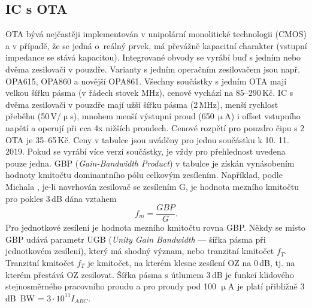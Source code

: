 \subsection{IC s OTA}
OTA bývá nejčastěji implementován v unipolární monolitické technologii (CMOS) a v případě, že se jedná o~reálný prvek, má převážně kapacitní charakter (vstupní impedance se stává kapacitou). Integrované obvody se vyrábí buď s jedním nebo dvěma zesilovači v pouzdře. Varianty s jedním operačním zesilovačem jsou např. OPA615, OPA860 a novější OPA861. Všechny součástky s jedním OTA mají velkou šířku pásma (v řádech stovek MHz), cenově vychází na 85--290\,Kč. IC s dvěma zesilovači v pouzdře mají užší šířku pásma (2\,MHz), menší rychlost přeběhu (50\,V/$\upmu$s), mnohem menší výstupní proud (650\,$\upmu$A) i offset vstupního napětí a operují při cca 4x nižších proudech. Cenové rozpětí pro pouzdro čipu s 2 OTA je 35--65\,Kč. Ceny v tabulce jsou uváděny pro jednu součástku k 10. 11. 2019. Pokud se vyrábí více verzí součástky, je vždy pro přehlednost uvedena pouze jedna. GBP (\textit{Gain-Bandwidth Product}) v tabulce je získán vynásobením hodnoty kmitočtu dominantního pólu celkovým zesílením. Například, podle Michala \cite{14}, je-li navrhován zesilovač se zesílením G, je hodnota mezního kmitočtu pro pokles 3\,dB dána vztahem
\begin{equation}
f_m = \frac{GBP}{G}.
\end{equation}
\noindent Pro jednotkové zesílení je hodnota mezního kmitočtu rovna GBP. Někdy se místo GBP udává parametr UGB (\textit{Unity Gain Bandwidth} --- šířka pásma při jednotkovém zesílení), který má shodný význam, nebo tranzitní kmitočet $f_T$. Tranzitní kmitočet $f_T$ je kmitočet, na kterém klesne zesílení OZ na 0\,dB, tj. na kterém přestává OZ zesilovat. Šířka pásma s útlumem 3\,dB je funkcí klidového stejnosměrného pracovního proudu a pro proudy pod 100 $\upmu$A je platí přibližně 3\,dB\ BW = $3 \cdot 10^{11} I_{ABC}$.
\renewcommand{\arraystretch}{1.5}
